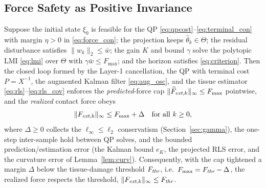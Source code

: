 \subsection{Force Safety as Positive Invariance}

\begin{proposition}\label{thm:force}
Suppose the initial state $\xi_0$ is feasible for the QP \eqref{eq:qpcost}--\eqref{eq:terminal_con} with margin $\eta>0$ in \eqref{eq:force_con}; the projection keeps $\hat\theta_k\in\Theta$; the residual disturbance satisfies $\|w_k\|_2\le\bar w$; the gain $K$ and bound $\gamma$ solve the polytopic LMI \eqref{eq:lmi} over $\Theta$ with $\gamma\bar w\le F_{\max}$; and the horizon satisfies \eqref{eq:criterion}. Then the closed loop formed by the Layer-1 cancellation, the QP with terminal cost $P=X^{-1}$, the augmented Kalman filter \eqref{eq:aug_osc}, and the tissue estimator \eqref{eq:rls}--\eqref{eq:rls_cov} enforces the \emph{predicted}-force cap $\|\widehat{F}_{\emph{ext},k}\|_\infty \le F_{\max}$ pointwise, and the \emph{realized} contact force obeys
\begin{equation*}
\|F_{\emph{ext},k}\|_\infty \le F_{\max} + \Delta\quad\text{for all }k\ge0,
\end{equation*}
where $\Delta\ge0$ collects the $\ell_\infty\!\le\!\ell_2$ conservatism (Section~\ref{sec:gamma}), the one-step inter-sample hold between QP solves, and the bounded prediction/estimation error (the Kalman bound $e_K$, the projected RLS error, and the curvature error of Lemma~\ref{lem:curv}). Consequently, with the cap tightened a margin $\Delta$ below the tissue-damage threshold $F_{\emph{thr}}$, i.e.\ $F_{\max}=F_{\emph{thr}}-\Delta$, the realized force respects the threshold, $\|F_{\emph{ext},k}\|_\infty \le F_{\emph{thr}}$.
\end{proposition}

